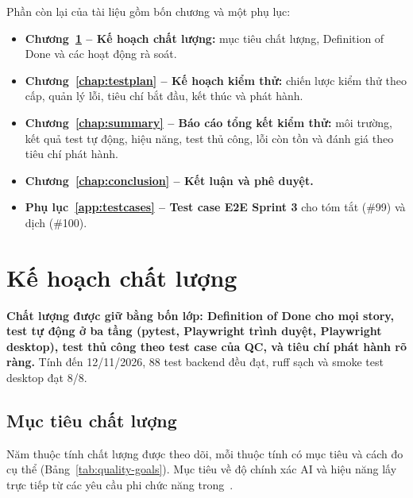 \documentclass[12pt,a4paper]{report}
\begin{document}
Phần còn lại của tài liệu gồm bốn chương và một phụ lục:
\begin{itemize}
  \item \textbf{Chương~\ref{chap:quality} -- Kế hoạch chất lượng:} mục tiêu chất lượng, Definition of Done và các
        hoạt động rà soát.
  \item \textbf{Chương~\ref{chap:testplan} -- Kế hoạch kiểm thử:} chiến lược kiểm thử theo cấp, quản lý lỗi, tiêu
        chí bắt đầu, kết thúc và phát hành.
  \item \textbf{Chương~\ref{chap:summary} -- Báo cáo tổng kết kiểm thử:} môi trường, kết quả test tự động, hiệu
        năng, test thủ công, lỗi còn tồn và đánh giá theo tiêu chí phát hành.
  \item \textbf{Chương~\ref{chap:conclusion} -- Kết luận và phê duyệt.}
  \item \textbf{Phụ lục~\ref{app:testcases} -- Test case E2E Sprint 3} cho tóm tắt (\#99) và dịch (\#100).
\end{itemize}

\chapter{Kế hoạch chất lượng}
\label{chap:quality}

\textbf{Chất lượng được giữ bằng bốn lớp: Definition of Done cho mọi story, test tự động ở ba tầng (pytest,
Playwright trình duyệt, Playwright desktop), test thủ công theo test case của QC, và tiêu chí phát hành rõ
ràng.} Tính đến 12/11/2026, 88 test backend đều đạt, ruff sạch và smoke test desktop đạt 8/8.

\section{Mục tiêu chất lượng}

Năm thuộc tính chất lượng được theo dõi, mỗi thuộc tính có mục tiêu và cách đo cụ thể
(Bảng~\ref{tab:quality-goals}). Mục tiêu về độ chính xác AI và hiệu năng lấy trực tiếp từ các yêu cầu phi chức
năng trong~\cite{srs}.
\end{document}
